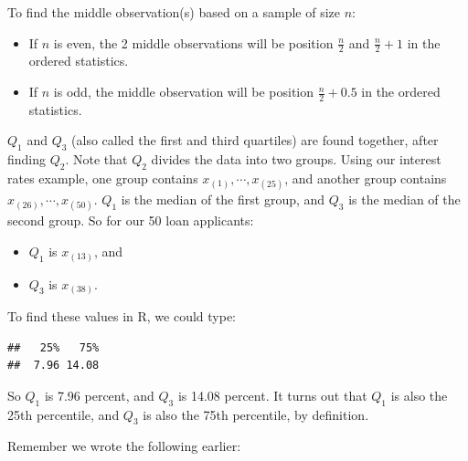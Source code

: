 \documentclass[
]{book}
\newenvironment{Shaded}{\begin{snugshade}}{\end{snugshade}}
\newcommand{\AttributeTok}[1]{\textcolor[rgb]{0.13,0.29,0.53}{#1}}
\newcommand{\DecValTok}[1]{\textcolor[rgb]{0.00,0.00,0.81}{#1}}
\newcommand{\FloatTok}[1]{\textcolor[rgb]{0.00,0.00,0.81}{#1}}
\newcommand{\FunctionTok}[1]{\textcolor[rgb]{0.13,0.29,0.53}{\textbf{#1}}}
\newcommand{\NormalTok}[1]{#1}
\newcommand{\SpecialCharTok}[1]{\textcolor[rgb]{0.81,0.36,0.00}{\textbf{#1}}}
\providecommand{\tightlist}{%
  \setlength{\itemsep}{0pt}\setlength{\parskip}{0pt}}
\begin{document}
To find the middle observation(s) based on a sample of size \(n\):

\begin{itemize}
\tightlist
\item
  If \(n\) is even, the 2 middle observations will be position \(\frac{n}{2}\) and \(\frac{n}{2} + 1\) in the ordered statistics.
\item
  If \(n\) is odd, the middle observation will be position \(\frac{n}{2} + 0.5\) in the ordered statistics.
\end{itemize}

\(Q_1\) and \(Q_3\) (also called the first and third quartiles) are found together, after finding \(Q_2\). Note that \(Q_2\) divides the data into two groups. Using our interest rates example, one group contains \(x_{(1)}, \cdots, x_{(25)}\), and another group contains \(x_{(26)}, \cdots, x_{(50)}\). \(Q_1\) is the median of the first group, and \(Q_3\) is the median of the second group. So for our 50 loan applicants:

\begin{itemize}
\tightlist
\item
  \(Q_1\) is \(x_{(13)}\), and
\item
  \(Q_3\) is \(x_{(38)}\).
\end{itemize}

To find these values in R, we could type:

\begin{Shaded}
\end{Shaded}

\begin{verbatim}
##   25%   75% 
##  7.96 14.08
\end{verbatim}

So \(Q_1\) is 7.96 percent, and \(Q_3\) is 14.08 percent. It turns out that \(Q_1\) is also the 25th percentile, and \(Q_3\) is also the 75th percentile, by definition.

Remember we wrote the following earlier:
\end{document}
